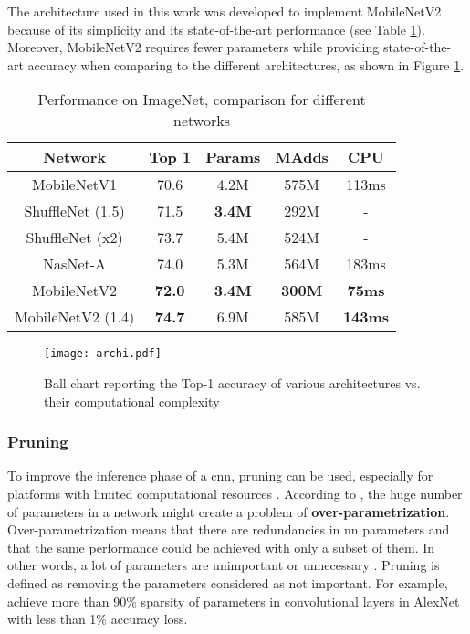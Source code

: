 The architecture used in this work was developed to implement MobileNetV2 because of its simplicity and its state-of-the-art performance (see Table \ref{tab:mbv2}). Moreover, MobileNetV2 requires fewer parameters while providing state-of-the-art accuracy when comparing to the different architectures, as shown in Figure \ref{fig:archi}.
%
\begin{table}[H]
    \center
    \begin{tabular}{ | c | c | c c | c| }
        \hline \hline
        Network & Top 1 & Params & MAdds & CPU \\
        \hline \hline
        MobileNetV1 & 70.6 & 4.2M & 575M & 113ms \\
        ShuffleNet (1.5) & 71.5 & \textbf{3.4M} & 292M & - \\
        ShuffleNet (x2)  & 73.7 & 5.4M & 524M & - \\
        NasNet-A & 74.0 & 5.3M & 564M & 183ms \\
        \hline
        MobileNetV2 & \textbf{72.0} & \textbf{3.4M} & \textbf{300M} & \textbf{75ms} \\
        MobileNetV2 (1.4) & \textbf{74.7} & 6.9M & 585M & \textbf{143ms} \\
        \hline \hline
    \end{tabular}
    \caption{Performance on ImageNet, comparison for different networks \cite{sandler_mobilenetv2_2018}}
    \label{tab:mbv2}
\end{table}

\begin{figure}[H]
    \centering
    \texttt{[image: archi.pdf]}
    \caption{Ball chart reporting the Top-1 accuracy of various architectures vs. their computational complexity \cite{canziani_analysis_2017}}
    \label{fig:archi}
\end{figure}
%
\subsubsection{Pruning} \label{subs:pruning}
%
To improve the inference phase of a \acrshort{cnn}, pruning can be used, especially for platforms with limited computational resources \cite{liu_rethinking_2019}. According to \textcite{liu_rethinking_2019, denton_exploiting_2014}, the huge number of parameters in a network might create a problem of \textbf{over-parametrization}. Over-parametrization means that there are redundancies in \acrshort{nn} parameters and that the same performance could be achieved with only a subset of them. In other words, a lot of parameters are unimportant or unnecessary \cite{cheng_recent_2018}. Pruning is defined as removing the parameters considered as not important. For example, \textcite{baoyuan_liu_sparse_2015} achieve more than 90\% sparsity of parameters in convolutional layers in AlexNet with less than 1\% accuracy loss.

